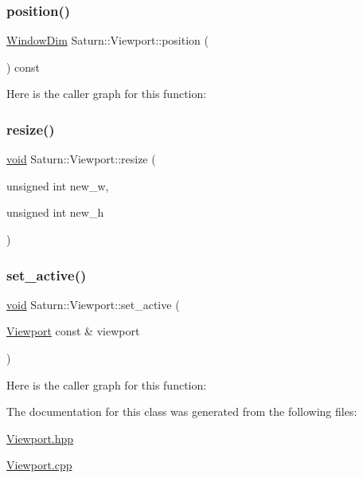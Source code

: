 \subsubsection{\texorpdfstring{position()}{position()}}
{\footnotesize\ttfamily \mbox{\hyperlink{namespace_saturn_a606451fdad804aef3b4f56f6805900f2}{Window\+Dim}} Saturn\+::\+Viewport\+::position (\begin{DoxyParamCaption}{ }\end{DoxyParamCaption}) const}

Here is the caller graph for this function\+:
\mbox{\label{class_saturn_1_1_viewport_ad199d45e3adb0c02a84603c72a203fe9}} 
\subsubsection{\texorpdfstring{resize()}{resize()}}
{\footnotesize\ttfamily \mbox{\hyperlink{glad_8h_a950fc91edb4504f62f1c577bf4727c29}{void}} Saturn\+::\+Viewport\+::resize (\begin{DoxyParamCaption}\item[{unsigned int}]{new\+\_\+w,  }\item[{unsigned int}]{new\+\_\+h }\end{DoxyParamCaption})}

\mbox{\label{class_saturn_1_1_viewport_a888fd9e522cecfd2acb7f3fb54b12b20}} 
\subsubsection{\texorpdfstring{set\+\_\+active()}{set\_active()}}
{\footnotesize\ttfamily \mbox{\hyperlink{glad_8h_a950fc91edb4504f62f1c577bf4727c29}{void}} Saturn\+::\+Viewport\+::set\+\_\+active (\begin{DoxyParamCaption}\item[{\mbox{\hyperlink{class_saturn_1_1_viewport}{Viewport}} const \&}]{viewport }\end{DoxyParamCaption})\hspace{0.3cm}{\ttfamily [static]}}

Here is the caller graph for this function\+:


The documentation for this class was generated from the following files\+:\begin{DoxyCompactItemize}
\item 
\mbox{\hyperlink{_viewport_8hpp}{Viewport.\+hpp}}\item 
\mbox{\hyperlink{_viewport_8cpp}{Viewport.\+cpp}}\end{DoxyCompactItemize}
